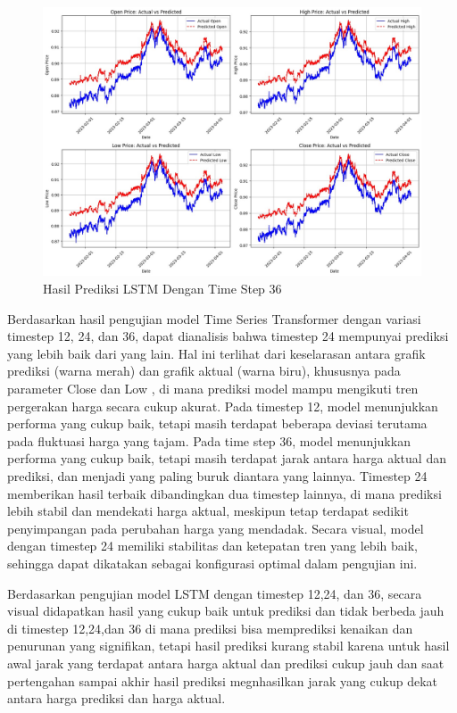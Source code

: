 \begin{figure} [H] \centering
    \includegraphics[scale=0.28]{gambar/hasillstm36.png} 
    \caption{Hasil Prediksi LSTM Dengan Time Step 36}
    \label{fig:label_gambar}
\end{figure}


Berdasarkan hasil pengujian model Time Series Transformer dengan variasi timestep 12, 24, dan 36, dapat dianalisis bahwa timestep 24 mempunyai prediksi yang lebih baik dari yang lain. Hal ini terlihat dari keselarasan antara grafik prediksi (warna merah) dan grafik aktual (warna biru), khususnya pada parameter Close dan Low , di mana prediksi model mampu mengikuti tren pergerakan harga secara cukup akurat. Pada timestep 12, model menunjukkan performa yang cukup baik, tetapi masih terdapat beberapa deviasi terutama pada fluktuasi harga yang tajam. Pada time step 36, model menunjukkan performa yang cukup baik, tetapi masih terdapat jarak antara harga aktual dan prediksi, dan menjadi yang paling buruk diantara yang lainnya. Timestep 24 memberikan hasil terbaik dibandingkan dua timestep lainnya, di mana prediksi lebih stabil dan mendekati harga aktual, meskipun tetap terdapat sedikit penyimpangan pada perubahan harga yang mendadak. Secara visual, model dengan timestep 24 memiliki stabilitas dan ketepatan tren yang lebih baik, sehingga dapat dikatakan sebagai konfigurasi optimal dalam pengujian ini.

Berdasarkan pengujian model LSTM dengan timestep 12,24, dan 36, secara visual didapatkan hasil yang cukup baik untuk prediksi dan tidak berbeda jauh di timestep 12,24,dan 36 di mana prediksi bisa memprediksi kenaikan dan penurunan yang signifikan, tetapi hasil prediksi kurang stabil karena untuk hasil awal jarak yang terdapat antara harga aktual dan prediksi cukup jauh dan saat pertengahan sampai akhir hasil prediksi megnhasilkan jarak yang cukup dekat antara harga prediksi dan harga aktual.


